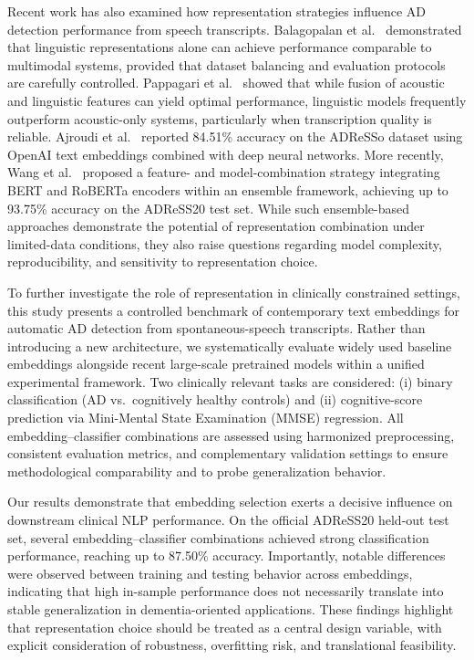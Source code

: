 \documentclass[final,5p,times]{elsarticle}
\begin{document}
Recent work has also examined how representation strategies influence AD detection performance from speech transcripts. Balagopalan et al.~\cite{Balagopalan2021} demonstrated that linguistic representations alone can achieve performance comparable to multimodal systems, provided that dataset balancing and evaluation protocols are carefully controlled. Pappagari et al.~\cite{Pappagari2021} showed that while fusion of acoustic and linguistic features can yield optimal performance, linguistic models frequently outperform acoustic-only systems, particularly when transcription quality is reliable. Ajroudi et al.~\cite{Ajroudi2024} reported 84.51\% accuracy on the ADReSSo dataset using OpenAI text embeddings combined with deep neural networks. More recently, Wang et al.~\cite{Wang2022} proposed a feature- and model-combination strategy integrating BERT and RoBERTa encoders within an ensemble framework, achieving up to 93.75\% accuracy on the ADReSS20 test set. While such ensemble-based approaches demonstrate the potential of representation combination under limited-data conditions, they also raise questions regarding model complexity, reproducibility, and sensitivity to representation choice.

To further investigate the role of representation in clinically constrained settings, this study presents a controlled benchmark of contemporary text embeddings for automatic AD detection from spontaneous-speech transcripts. Rather than introducing a new architecture, we systematically evaluate widely used baseline embeddings alongside recent large-scale pretrained models within a unified experimental framework. Two clinically relevant tasks are considered: (i) binary classification (AD vs.\ cognitively healthy controls) and (ii) cognitive-score prediction via Mini-Mental State Examination (MMSE) regression. All embedding–classifier combinations are assessed using harmonized preprocessing, consistent evaluation metrics, and complementary validation settings to ensure methodological comparability and to probe generalization behavior.

Our results demonstrate that embedding selection exerts a decisive influence on downstream clinical NLP performance. On the official ADReSS20 held-out test set, several embedding–classifier combinations achieved strong classification performance, reaching up to 87.50\% accuracy. Importantly, notable differences were observed between training and testing behavior across embeddings, indicating that high in-sample performance does not necessarily translate into stable generalization in dementia-oriented applications. These findings highlight that representation choice should be treated as a central design variable, with explicit consideration of robustness, overfitting risk, and translational feasibility.
\end{document}
